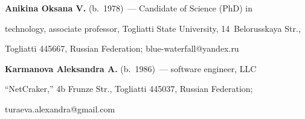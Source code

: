   \textbf{Anikina Oksana V.} (b.\ 1978)~--- Candidate of Science (PhD) in 


technology, associate professor, Togliatti State University, 14~Belorusskaya Str., 


Togliatti 445667, Russian Federation; blue-waterfall@yandex.ru


    


  \vspace*{3pt}


  


  \noindent


    \textbf{Karmanova Aleksandra A.} (b.\ 1986)~--- software engineer, LLC 


``NetCraker,'' 4b Frunze Str.,  Togliatti 445037, Russian Federation;\linebreak 


turaeva.alexandra@gmail.com


  


 \label{end\stat}








\renewcommand{\bibname}{\protect\rm Литература}


    


